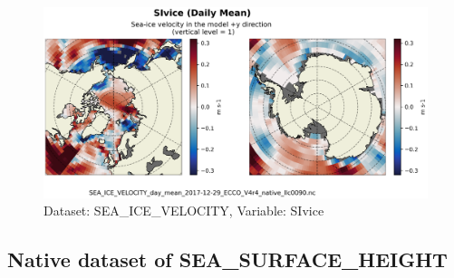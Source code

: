 \begin{figure}[H]
\centering
\includegraphics[scale=0.55]{../images/plots/native_plots/Sea-Ice_Velocity/SIvice.png}
\caption{Dataset: SEA\_ICE\_VELOCITY, Variable: SIvice}
\label{tab:table-SEA_ICE_VELOCITY_SIvice-Plot}
\end{figure}
\newpage
\subsection{Native dataset of SEA\_SURFACE\_HEIGHT}
\newp
